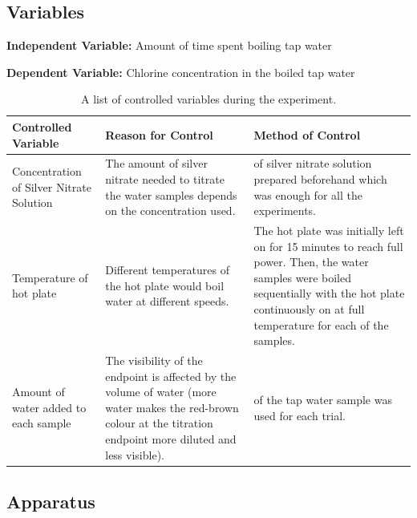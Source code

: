 \documentclass[11pt]{article}
\begin{document}
\subsection{Variables}

\textbf{Independent Variable:} Amount of time spent boiling tap water

\smallskip

\noindent\textbf{Dependent Variable:} Chlorine concentration in the boiled tap water

\begin{table}[H]
	\def\arraystretch{1.5}
	\caption{A list of controlled variables during the experiment.}
	\begin{tabularx}{\linewidth}{|
			>{\RaggedRight}X|
			>{\RaggedRight}X|
			>{\RaggedRight}X|
		}
		\hline
		\textbf{Controlled Variable}
		 & \textbf{Reason for Control}
		 & \textbf{Method of Control}
		\\\hline
		Concentration of Silver Nitrate Solution
		 & The amount of silver nitrate needed to titrate the water samples depends on the concentration used.
		 & 50\ml of silver nitrate solution prepared beforehand which was enough for all the experiments.
		\\\hline
		Temperature of hot plate
		 & Different temperatures of the hot plate would boil water at different speeds.
		 & The hot plate was initially left on for 15 minutes to reach full power. Then, the water samples were boiled sequentially with the hot plate continuously on at full temperature for each of the samples.
		\\\hline
		Amount of water added to each sample
		 & The visibility of the endpoint is affected by the volume of water (more water makes the red-brown colour at the titration endpoint more diluted and less visible).
		 & 10\ml of the tap water sample was used for each trial.
		\\\hline
	\end{tabularx}
\end{table}

\subsection{Apparatus}
\end{document}
